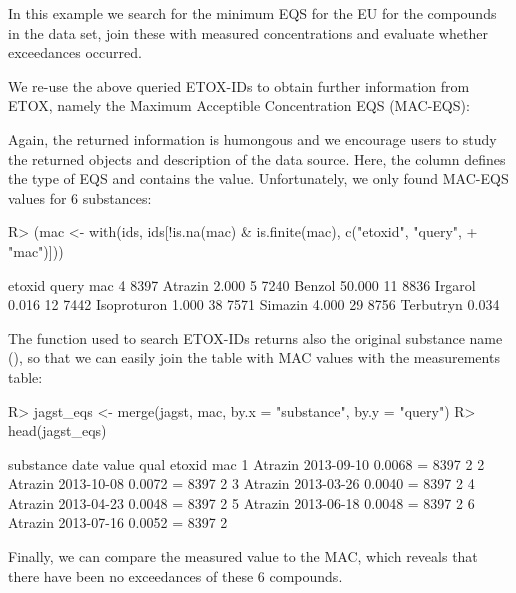 \documentclass[article]{jss}
\begin{document}
In this example we search for the minimum EQS for the EU for the
compounds in the  data set, join these with measured
concentrations and evaluate whether exceedances occurred.

We re-use the above queried ETOX-IDs to obtain further information
from ETOX, namely the Maximum Acceptible Concentration EQS (MAC-EQS):
% 
\begin{CodeChunk}
\end{CodeChunk}
%
Again, the returned information is humongous and we encourage users to study the returned objects and description of the data source.
Here, the column  defines the type of EQS and  contains the value.
Unfortunately, we only found MAC-EQS values for 6 substances:
%
\begin{CodeChunk}
\begin{CodeInput}
R> (mac <- with(ids, ids[!is.na(mac) & is.finite(mac), c("etoxid", "query",
+    "mac")]))
\end{CodeInput}
\begin{CodeOutput}
   etoxid       query    mac
4    8397     Atrazin  2.000
5    7240      Benzol 50.000
11   8836     Irgarol  0.016
12   7442 Isoproturon  1.000
38   7571     Simazin  4.000
29   8756   Terbutryn  0.034
\end{CodeOutput}
\end{CodeChunk}
%
The  function used to search ETOX-IDs returns also
the original substance name (), so that we can easily join
the table with MAC values with the measurements table:
% 
\begin{CodeChunk}
\begin{CodeInput}
R> jagst_eqs <- merge(jagst, mac, by.x = "substance", by.y = "query")
R> head(jagst_eqs)
\end{CodeInput}
\begin{CodeOutput}
  substance       date  value qual etoxid mac
1   Atrazin 2013-09-10 0.0068    =   8397   2
2   Atrazin 2013-10-08 0.0072    =   8397   2
3   Atrazin 2013-03-26 0.0040    =   8397   2
4   Atrazin 2013-04-23 0.0048    =   8397   2
5   Atrazin 2013-06-18 0.0048    =   8397   2
6   Atrazin 2013-07-16 0.0052    =   8397   2
\end{CodeOutput}
\end{CodeChunk}
%
Finally, we can compare the measured value to the MAC, which reveals that there have been no exceedances of these 6 compounds.
\end{document}
